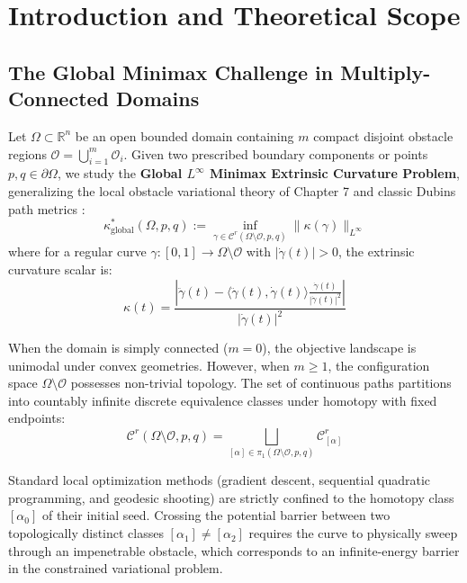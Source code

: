 \documentclass[11pt,reqno]{amsart}
\theoremstyle{definition}
\providecommand{\R}{\mathbb{R}}
\numberwithin{equation}{section}
\providecommand{\R}{\mathbb{R}}
\begin{document}
\tableofcontents
\newpage

\section{Introduction and Theoretical Scope}

\subsection{The Global Minimax Challenge in Multiply-Connected Domains}
Let $\Omega \subset \R^n$ be an open bounded domain containing $m$ compact disjoint obstacle regions $\mathcal{O} = \bigcup_{i=1}^m \mathcal{O}_i$. Given two prescribed boundary components or points $p, q \in \partial\Omega$, we study the \textbf{Global $L^\infty$ Minimax Extrinsic Curvature Problem}, generalizing the local obstacle variational theory of Chapter 7 \cite{silvafilho2026minimax} and classic Dubins path metrics \cite{dubins1957}:
\begin{equation}
\label{eq:global_minimax_problem}
\kappa^*_{\mathrm{global}}(\Omega, p, q) := \inf_{\gamma \in \mathcal{C}^r(\Omega \setminus \mathcal{O}, p, q)} \|\kappa(\gamma)\|_{L^\infty}
\end{equation}
where for a regular curve $\gamma: [0, 1] \to \Omega \setminus \mathcal{O}$ with $|\dot{\gamma}(t)| > 0$, the extrinsic curvature scalar is:
\begin{equation}
\kappa(t) = \frac{|\ddot{\gamma}(t) - \langle \ddot{\gamma}(t), \dot{\gamma}(t) \rangle \frac{\dot{\gamma}(t)}{|\dot{\gamma}(t)|^2}|}{|\dot{\gamma}(t)|^2}
\end{equation}

When the domain is simply connected ($m=0$), the objective landscape is unimodal under convex geometries. However, when $m \ge 1$, the configuration space $\Omega \setminus \mathcal{O}$ possesses non-trivial topology. The set of continuous paths partitions into countably infinite discrete equivalence classes under homotopy with fixed endpoints:
\begin{equation}
\mathcal{C}^r(\Omega \setminus \mathcal{O}, p, q) = \bigsqcup_{[\alpha] \in \pi_1(\Omega \setminus \mathcal{O}, p, q)} \mathcal{C}^r_{[\alpha]}
\end{equation}

Standard local optimization methods (gradient descent, sequential quadratic programming, and geodesic shooting) are strictly confined to the homotopy class $[\alpha_0]$ of their initial seed. Crossing the potential barrier between two topologically distinct classes $[\alpha_1] \neq [\alpha_2]$ requires the curve to physically sweep through an impenetrable obstacle, which corresponds to an infinite-energy barrier in the constrained variational problem.
\end{document}
